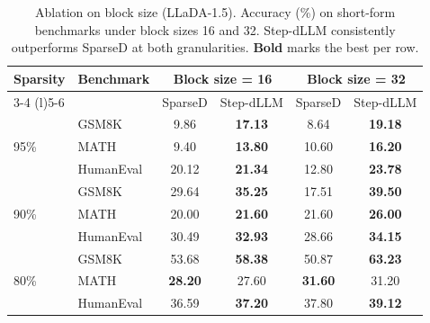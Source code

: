 \begin{table}[t]
\centering
\caption{Ablation on block size (LLaDA-1.5). Accuracy (\%) on short-form benchmarks under block sizes 16 and 32. Step-dLLM consistently outperforms SparseD at both granularities. \textbf{Bold} marks the best per row.}
\label{tab:ablation-blocksize}
\setlength{\tabcolsep}{6pt}
\renewcommand{\arraystretch}{1.15}

\begin{tabular}{@{}ll cc cc@{}}
\toprule
\multirow{2.5}{*}{\textbf{Sparsity}} & \multirow{2.5}{*}{\textbf{Benchmark}}
  & \multicolumn{2}{c}{\textbf{Block size = 16}}
  & \multicolumn{2}{c}{\textbf{Block size = 32}} \\
\cmidrule(lr){3-4} \cmidrule(l){5-6}
& & SparseD & Step-dLLM & SparseD & Step-dLLM \\
\midrule

\multirow{3}{*}{95\%}
  & GSM8K     &  9.86 & \textbf{17.13} &  8.64 & \textbf{19.18} \\
  & MATH      &  9.40 & \textbf{13.80} & 10.60 & \textbf{16.20} \\
  & HumanEval & 20.12 & \textbf{21.34} & 12.80 & \textbf{23.78} \\

\midrule
\multirow{3}{*}{90\%}
  & GSM8K     & 29.64 & \textbf{35.25} & 17.51 & \textbf{39.50} \\
  & MATH      & 20.00 & \textbf{21.60} & 21.60 & \textbf{26.00} \\
  & HumanEval & 30.49 & \textbf{32.93} & 28.66 & \textbf{34.15} \\

\midrule
\multirow{3}{*}{80\%}
  & GSM8K     & 53.68 & \textbf{58.38} & 50.87 & \textbf{63.23} \\
  & MATH      & \textbf{28.20} & 27.60 & \textbf{31.60} & 31.20 \\
  & HumanEval & 36.59 & \textbf{37.20} & 37.80 & \textbf{39.12} \\

\bottomrule
\end{tabular}
\end{table}
